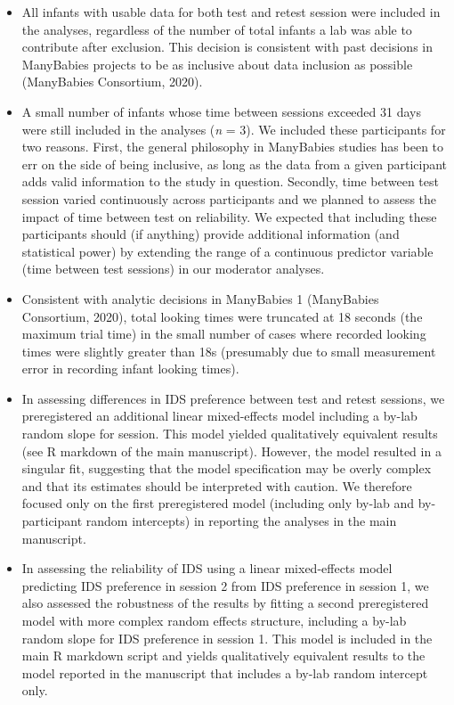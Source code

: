 \documentclass[
  man, donotrepeattitle,floatsintext]{apa6}
\providecommand{\tightlist}{%
  \setlength{\itemsep}{0pt}\setlength{\parskip}{0pt}}
\begin{document}
\begin{itemize}
\tightlist
\item
  All infants with usable data for both test and retest session were included in the analyses, regardless of the number of total infants a lab was able to contribute after exclusion. This decision is consistent with past decisions in ManyBabies projects to be as inclusive about data inclusion as possible (ManyBabies Consortium, 2020).
\item
  A small number of infants whose time between sessions exceeded 31 days were still included in the analyses (\emph{n} = 3). We included these participants for two reasons. First, the general philosophy in ManyBabies studies has been to err on the side of being inclusive, as long as the data from a given participant adds valid information to the study in question. Secondly, time between test session varied continuously across participants and we planned to assess the impact of time between test on reliability. We expected that including these participants should (if anything) provide additional information (and statistical power) by extending the range of a continuous predictor variable (time between test sessions) in our moderator analyses.
\item
  Consistent with analytic decisions in ManyBabies 1 (ManyBabies Consortium, 2020), total looking times were truncated at 18 seconds (the maximum trial time) in the small number of cases where recorded looking times were slightly greater than 18s (presumably due to small measurement error in recording infant looking times).
\item
  In assessing differences in IDS preference between test and retest sessions, we preregistered an additional linear mixed-effects model including a by-lab random slope for session. This model yielded qualitatively equivalent results (see R markdown of the main manuscript). However, the model resulted in a singular fit, suggesting that the model specification may be overly complex and that its estimates should be interpreted with caution. We therefore focused only on the first preregistered model (including only by-lab and by-participant random intercepts) in reporting the analyses in the main manuscript.
\item
  In assessing the reliability of IDS using a linear mixed-effects model predicting IDS preference in session 2 from IDS preference in session 1, we also assessed the robustness of the results by fitting a second preregistered model with more complex random effects structure, including a by-lab random slope for IDS preference in session 1. This model is included in the main R markdown script and yields qualitatively equivalent results to the model reported in the manuscript that includes a by-lab random intercept only.

\end{itemize}
\end{document}
